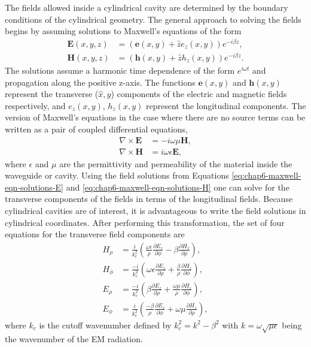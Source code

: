 The fields allowed inside a cylindrical cavity are determined by the boundary conditions of the cylindrical geometry. The general approach to solving the fields begins by assuming solutions to Maxwell's equations of the form
\begin{align}
    \label{eq:chap6-maxwell-eqn-solutions-E}\bm{E}(x,y,z)&=(\bm{e}(x,y)+\hat{z}e_z(x,y))e^{-i\beta z},\\
    \label{eq:chap6-maxwell-eqn-solutions-H}\bm{H}(x,y,z)&=(\bm{h}(x,y)+\hat{z}h_z(x,y))e^{-i\beta z}.
\end{align}
The solutions assume a harmonic time dependence of the form $e^{i\omega t}$ and propagation along the positive z-axis. The functions $\bm{e}(x,y)$ and $\bm{h}(x,y)$ represent the transverse ($\hat{x}, \hat{y}$) components of the electric and magnetic fields respectively, and $e_z(x,y)$, $h_z(x,y)$ represent the longitudinal components. The version of Maxwell's equations in the case where there are no source terms can be written as a pair of coupled differential equations, 
\begin{align}
    \nabla\times\bm{E}&=-i\omega\mu\bm{H},\\
    \nabla\times\bm{H}&=i\omega\epsilon\bm{E},
\end{align}
where $\epsilon$ and $\mu$ are the permittivity and permeability of the material inside the waveguide or cavity. Using the field solutions from Equations \ref{eq:chap6-maxwell-eqn-solutions-E} and \ref{eq:chap6-maxwell-eqn-solutions-H} one can solve for the transverse components of the fields in terms of the longitudinal fields. Because cylindrical cavities are of interest, it is advantageous to write the field solutions in cylindrical coordinates. After performing this transformation, the set of four equations for the transverse field components are
\begin{align}
    H_\rho&=\frac{i}{k_c^2}\left(\frac{\omega\epsilon}{\rho}\frac{\partial E_z}{\partial \phi}-\beta \frac{\partial H_z}{\partial \rho}\right),\\
    H_\phi&=\frac{-i}{k_c^2}\left(\omega\epsilon\frac{\partial E_z}{\partial \rho}+\frac{\beta}{\rho}\frac{\partial H_z}{\partial \phi}\right),\\
    E_\rho&=\frac{-i}{k_c^2}\left(\beta\frac{\partial E_z}{\partial \rho}+\frac{\omega\mu}{\rho}\frac{\partial H_z}{\partial \phi}\right),\\
    E_\phi&=\frac{i}{k_c^2}\left(\frac{-\beta}{\rho}\frac{\partial E_z}{\partial \phi}+\omega\mu\frac{\partial H_z}{\partial \rho}\right),
\end{align}
where $k_c$ is the cutoff wavenumber defined by $k_c^2=k^2-\beta^2$ with $k=\omega\sqrt{\mu\epsilon}$ being the wavenumber of the EM radiation. 

